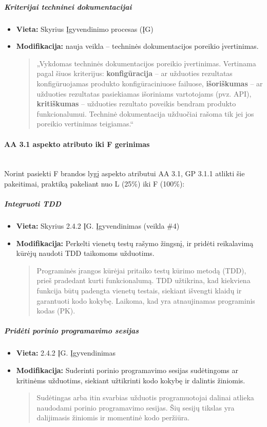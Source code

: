 \documentclass{article}
\newcommand{\subsubsubsection}[1]{\paragraph{#1}\mbox{}\\}
\begin{document}
\subparagraph{Kriterijai techninei dokumentacijai}
\begin{itemize}
    \item \textbf{Vieta:}  Skyrius Įgyvendinimo procesas (ĮG)
    \item \textbf{Modifikacija:} nauja veikla -- techninės dokumentacijos poreikio įvertinimas.
\begin{quote}
„Vykdomas techninės dokumentacijos poreikio įvertinimas. Vertinama pagal šiuos kriterijus: \textbf{konfigūracija} -- ar užduoties rezultatas konfigūruojamas produkto konfigūraciniuose failuose, \textbf{išoriškumas} -- ar užduoties rezultatas pasiekiamas išoriniams vartotojams (pvz. API), \textbf{kritiškumas} -- užduoties rezultato poveikis bendram produkto funkcionalumui. Techninė dokumentacija užduočiai rašoma tik jei jos poreikio vertinimas teigiamas.“
\end{quote}
\end{itemize}

\subsubsubsection{AA 3.1 aspekto atributo iki F gerinimas}

Norint pasiekti F brandos lygį aspekto atributui AA 3.1, GP 3.1.1 atlikti šie pakeitimai, praktiką pakeliant nuo L (25\%) iki F (100\%):

\subparagraph{Integruoti TDD}
\begin{itemize}
    \item \textbf{Vieta:} Skyrius 2.4.2 ĮG. Įgyvendinimas (veikla \#4)
    \item \textbf{Modifikacija:} Perkelti vienetų testų rašymo žingsnį, ir pridėti reikalavimą kūrėjų naudoti TDD taikomoms užduotims.
    \begin{quote} Programinės įrangos kūrėjai pritaiko testų kūrimo metodą (TDD), prieš pradedant kurti funkcionalumą. TDD užtikrina, kad kiekviena funkcija būtų padengta vienetų testais, siekiant išvengti klaidų ir garantuoti kodo kokybę. Laikoma, kad yra atnaujinamas programinis kodas (PK).
    \end{quote}
\end{itemize}

\subparagraph{Pridėti porinio programavimo sesijas}
\begin{itemize}
    \item \textbf{Vieta:} 2.4.2 ĮG. Įgyvendinimas
    \item \textbf{Modifikacija:} Suderinti porinio programavimo sesijas sudėtingoms ar kritinėms užduotims, siekiant užtikrinti kodo kokybę ir dalintis žiniomis.
    \begin{quote} Sudėtingas arba itin svarbias užduotis programuotojai dalinai atlieka naudodami porinio programavimo sesijas. Šių sesijų tikslas yra dalijimasis žiniomis ir momentinė kodo peržiūra.
    \end{quote}
\end{itemize}
\end{document}
